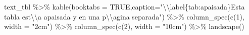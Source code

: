\documentclass[12pt,a4paper,oneside,]{book}
\newenvironment{Shaded}{\begin{snugshade}}{\end{snugshade}}
\newcommand{\AttributeTok}[1]{\textcolor[rgb]{0.77,0.63,0.00}{#1}}
\newcommand{\ConstantTok}[1]{\textcolor[rgb]{0.00,0.00,0.00}{#1}}
\newcommand{\DecValTok}[1]{\textcolor[rgb]{0.00,0.00,0.81}{#1}}
\newcommand{\FunctionTok}[1]{\textcolor[rgb]{0.00,0.00,0.00}{#1}}
\newcommand{\NormalTok}[1]{#1}
\newcommand{\SpecialCharTok}[1]{\textcolor[rgb]{0.00,0.00,0.00}{#1}}
\newcommand{\StringTok}[1]{\textcolor[rgb]{0.31,0.60,0.02}{#1}}
\numberwithin{dummy}{section}
\theoremstyle{ocrenumbox}
\theoremstyle{blacknumex}
\theoremstyle{blacknumbox}
\theoremstyle{ocrenum}
\theoremstyle{ocrenum}
\begin{document}
\begin{Shaded}
\begin{Highlighting}[]
\NormalTok{text\_tbl }\SpecialCharTok{\%\textgreater{}\%}
  \FunctionTok{kable}\NormalTok{(}\AttributeTok{booktabs =} \ConstantTok{TRUE}\NormalTok{,}\AttributeTok{caption=}\StringTok{"}\SpecialCharTok{\textbackslash{}\textbackslash{}}\StringTok{label\{tab:apaisada\}Esta tabla }
\StringTok{          est}\SpecialCharTok{\textbackslash{}\textbackslash{}}\StringTok{\textquotesingle{}a apaisada y en una p}\SpecialCharTok{\textbackslash{}\textbackslash{}}\StringTok{\textquotesingle{}agina separada"}\NormalTok{) }\SpecialCharTok{\%\textgreater{}\%} 
      \FunctionTok{column\_spec}\NormalTok{(}\FunctionTok{c}\NormalTok{(}\DecValTok{1}\NormalTok{), }
          \AttributeTok{width =} \StringTok{"2cm"}\NormalTok{) }\SpecialCharTok{\%\textgreater{}\%} 
      \FunctionTok{column\_spec}\NormalTok{(}\FunctionTok{c}\NormalTok{(}\DecValTok{2}\NormalTok{), }
          \AttributeTok{width =} \StringTok{"10cm"}\NormalTok{) }\SpecialCharTok{\%\textgreater{}\%} 
      \FunctionTok{landscape}\NormalTok{()}
\end{Highlighting}
\end{Shaded}
\end{document}
